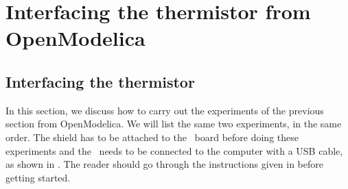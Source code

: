 \section{Interfacing the thermistor from OpenModelica}
\subsection{Interfacing the thermistor}
In this section, we discuss how to carry out the experiments of the
previous section from OpenModelica.  We will list the same two experiments,
in the same order.  The shield has to be attached to the \arduino\ board
before doing these experiments and the \arduino\ needs to be connected to the computer
with a USB cable, as shown in .
The reader should go through the instructions given in
 before getting started.

